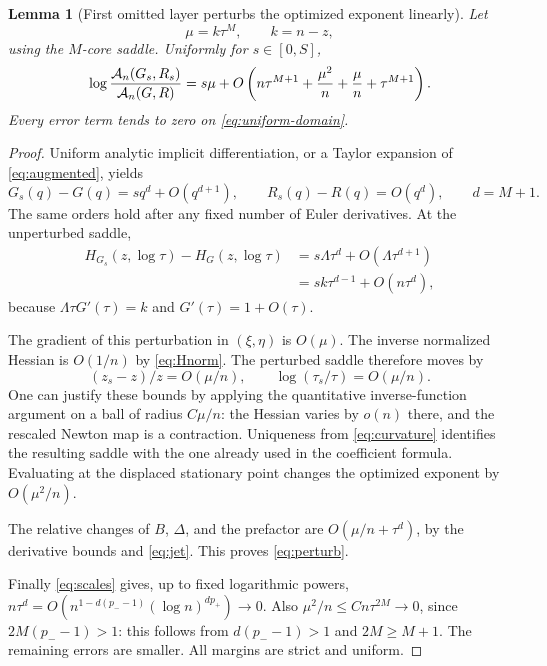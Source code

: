 \documentclass[11pt,a4paper]{article}
\numberwithin{equation}{section}
\newtheorem{lemma}[theorem]{Lemma}
\theoremstyle{definition}
\theoremstyle{remark}
\begin{document}
\begin{lemma}[First omitted layer perturbs the optimized exponent linearly]
\label{lem:perturb}
Let
\begin{equation}
 \mu=k\tau^M,\qquad k=n-z,
 \label{eq:mu}
\end{equation}
using the $M$-core saddle. Uniformly for $s\in[0,S]$,
\begin{equation}
 \log\frac{\mathcal A_n(G_s,R_s)}{\mathcal A_n(G,R)}
 =s\mu+O\left(n\tau^{M+1}+\frac{\mu^2}{n}
                  +\frac{\mu}{n}+\tau^{M+1}\right).
 \label{eq:perturb}
\end{equation}
Every error term tends to zero on \eqref{eq:uniform-domain}.
\end{lemma}
\begin{proof}
Uniform analytic implicit differentiation, or a Taylor expansion of
\eqref{eq:augmented}, yields
\begin{equation}
 G_s(q)-G(q)=s q^d+O(q^{d+1}),\qquad
 R_s(q)-R(q)=O(q^d),\qquad d=M+1.
 \label{eq:jet}
\end{equation}
The same orders hold after any fixed number of Euler derivatives. At the
unperturbed saddle,
\begin{align*}
 H_{G_s}(z,\log\tau)-H_G(z,\log\tau)
 &=s\Lambda\tau^d+O(\Lambda\tau^{d+1})\\
 &=s k\tau^{d-1}+O(n\tau^d),
\end{align*}
because $\Lambda\tau G'(\tau)=k$ and $G'(\tau)=1+O(\tau)$.

The gradient of this perturbation in $(\xi,\eta)$ is $O(\mu)$.
The inverse normalized Hessian is $O(1/n)$ by \eqref{eq:Hnorm}.
The perturbed saddle therefore moves by
\begin{equation}
 (z_s-z)/z=O(\mu/n),\qquad
 \log(\tau_s/\tau)=O(\mu/n).
 \label{eq:shift}
\end{equation}
One can justify these bounds by applying the quantitative inverse-function
argument on a ball of radius $C\mu/n$: the Hessian varies by $o(n)$ there,
and the rescaled Newton map is a contraction. Uniqueness from
\eqref{eq:curvature} identifies the resulting saddle with the one already
used in the coefficient formula. Evaluating at the displaced stationary
point changes the optimized exponent by $O(\mu^2/n)$.

The relative changes of $B$, $\Delta$, and the prefactor are
$O(\mu/n+\tau^d)$, by the derivative bounds and \eqref{eq:jet}.
This proves \eqref{eq:perturb}.

Finally \eqref{eq:scales} gives, up to fixed logarithmic powers,
$n\tau^d=O(n^{1-d(p_--1)}(\log n)^{dp_+})\to0$.
Also $\mu^2/n\le C n\tau^{2M}\to0$, since
$2M(p_--1)>1$: this follows from $d(p_--1)>1$ and $2M\ge M+1$.
The remaining errors are smaller. All margins are strict and uniform.
\end{proof}
\end{document}
